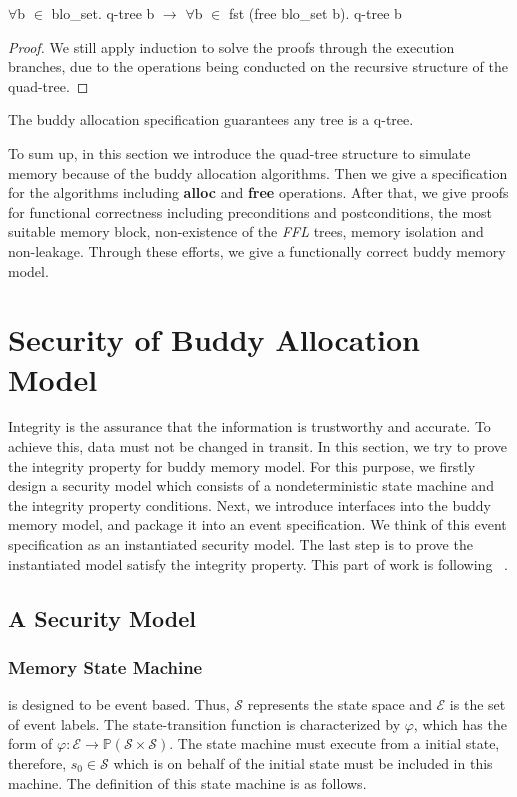 \documentclass[runningheads]{llncs}
\begin{document}
\begin{lemma}
$\forall$b $\in$ blo\_set. q-tree b $\longrightarrow$ $\forall$b $\in$ fst (free blo\_set b). q-tree b
\end{lemma}

\begin{proof}
We still apply induction to solve the proofs through the execution branches, due to the operations being conducted on the recursive structure of the quad-tree.
\end{proof}

\begin{theorem}
The buddy allocation specification guarantees any tree is a q-tree.
\end{theorem}

To sum up, in this section we introduce the quad-tree structure to simulate memory because of the buddy allocation algorithms. Then we give a specification for the algorithms including \textbf{alloc} and \textbf{free} operations. After that, we give proofs for functional correctness including preconditions and postconditions, the most suitable memory block, non-existence of the \textsl{FFL} trees, memory isolation and non-leakage. Through these efforts, we give a functionally correct buddy memory model.


\section{Security of Buddy Allocation Model}
Integrity is the assurance that the information is trustworthy and accurate. To achieve this, data must not be changed in transit. In this section, we try to prove the integrity property for buddy memory model. For this purpose, we firstly design a security model which consists of a nondeterministic state machine and the integrity property conditions. Next, we introduce interfaces into the buddy memory model, and package it into an event specification. We think of this event specification as an instantiated security model. The last step is to prove the instantiated model satisfy the integrity property.  This part of work is following ~\cite{reg_securitymodel}.

\subsection{A Security Model}

\subsubsection{Memory State Machine} is designed to be event based. Thus, $\mathcal{S}$ represents the state space and $\mathcal{E}$ is the set of event labels. The state-transition function is characterized by $\varphi$, which has the form of $\varphi: \mathcal{E} \rightarrow \mathbb{P}(\mathcal{S} \times \mathcal{S})$. The state machine must execute from a initial state, therefore, $s_0 \in \mathcal{S}$ which is on behalf of the initial state must be included in this machine. The definition of this state machine is as follows.
\end{document}
